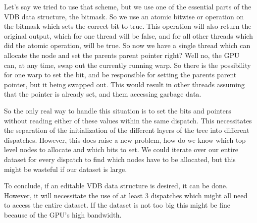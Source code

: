 Let's say we tried to use that scheme, but we use one of the essential parts of the VDB data structure, the bitmask. So we use an atomic bitwise or operation on the bitmask which sets the correct bit to true. This operation will also return the original output, which for one thread will be false, and for all other threads which did the atomic operation, will be true. So now we have a single thread which can allocate the node and set the parents parent pointer right? Well no, the GPU can, at any time, swap out the currently running warp. So there is the possibility for one warp to set the bit, and be responsible for setting the parents parent pointer, but it being swapped out. This would result in other threads assuming that the pointer is already set, and them accessing garbage data.

So the only real way to handle this situation is to set the bits and pointers without reading either of these values within the same dispatch. This necessitates the separation of the initialization of the different layers of the tree into different dispatches. However, this does raise a new problem, how do we know which top level nodes to allocate and which bits to set. We could iterate over our entire dataset for every dispatch to find which nodes have to be allocated, but this might be wasteful if our dataset is large.

To conclude, if an editable VDB data structure is desired, it can be done. However, it will necessitate the use of at least 3 dispatches which might all need to access the entire dataset. If the dataset is not too big this might be fine because of the GPU's high bandwidth.

